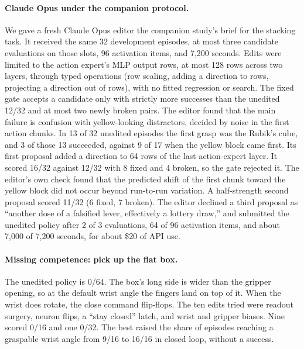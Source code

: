 \documentclass{article}
\begin{document}
\paragraph{Claude Opus under the companion protocol.} We gave a fresh Claude Opus editor the companion study's brief for the stacking task. It received the same 32 development episodes, at most three candidate evaluations on those slots, 96 activation items, and 7,200 seconds. Edits were limited to the action expert's MLP output rows, at most 128 rows across two layers, through typed operations (row scaling, adding a direction to rows, projecting a direction out of rows), with no fitted regression or search. The fixed gate accepts a candidate only with strictly more successes than the unedited 12/32 and at most two newly broken pairs. The editor found that the main failure is confusion with yellow-looking distractors, decided by noise in the first action chunks. In 13 of 32 unedited episodes the first grasp was the Rubik's cube, and 3 of those 13 succeeded, against 9 of 17 when the yellow block came first. Its first proposal added a direction to 64 rows of the last action-expert layer. It scored 16/32 against 12/32 with 8 fixed and 4 broken, so the gate rejected it. The editor's own check found that the predicted shift of the first chunk toward the yellow block did not occur beyond run-to-run variation. A half-strength second proposal scored 11/32 (6 fixed, 7 broken). The editor declined a third proposal as ``another dose of a falsified lever, effectively a lottery draw,'' and submitted the unedited policy after 2 of 3 evaluations, 64 of 96 activation items, and about 7,000 of 7,200 seconds, for about \$20 of API use.

\paragraph{Missing competence: pick up the flat box.} The unedited policy is 0/64. The box's long side is wider than the gripper opening, so at the default wrist angle the fingers land on top of it. When the wrist does rotate, the close command flip-flops. The ten edits tried were readout surgery, neuron flips, a ``stay closed'' latch, and wrist and gripper biases. Nine scored 0/16 and one 0/32. The best raised the share of episodes reaching a graspable wrist angle from 9/16 to 16/16 in closed loop, without a success.
\end{document}

